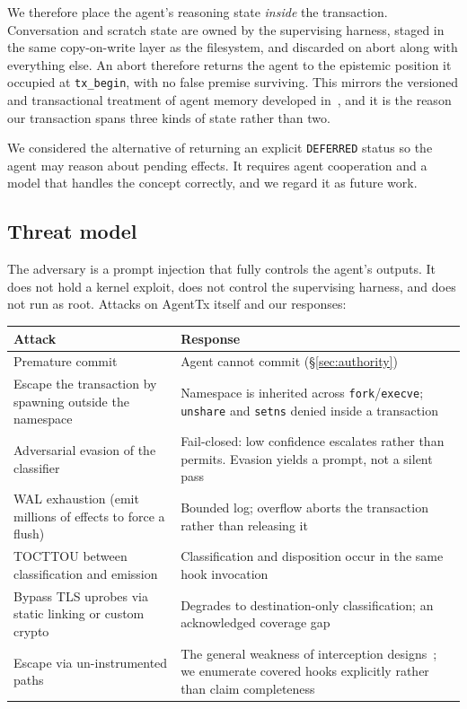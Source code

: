 \documentclass[10pt,twocolumn]{article}
\newcommand{\sys}{AgentTx}
\begin{document}
We therefore place the agent's reasoning state \emph{inside} the transaction.
Conversation and scratch state are owned by the supervising harness, staged in
the same copy-on-write layer as the filesystem, and discarded on abort along
with everything else. An abort therefore returns the agent to the
epistemic position it occupied at \texttt{tx\_begin}, with no false premise
surviving. This mirrors the versioned and transactional treatment of agent
memory developed in~\cite{chronomem2026,memtx2026}, and it is the reason our
transaction spans three kinds of state rather than two.

We considered the alternative of returning an explicit \texttt{DEFERRED} status
so the agent may reason about pending effects. It requires agent cooperation and
a model that handles the concept correctly, and we regard it as future work.

\subsection{Threat model}
\label{sec:threat}

The adversary is a prompt injection that fully controls the agent's outputs. It
does not hold a kernel exploit, does not control the supervising harness, and
does not run as root. Attacks on \sys{} itself and our responses:

\begin{center}
\small
\begin{tabular}{@{}p{2.6cm}p{4.6cm}@{}}
\toprule
\textbf{Attack} & \textbf{Response}\\
\midrule
Premature commit & Agent cannot commit (\S\ref{sec:authority})\\
Escape the transaction by spawning outside the namespace &
  Namespace is inherited across \texttt{fork}/\texttt{execve};
  \texttt{unshare} and \texttt{setns} denied inside a transaction\\
Adversarial evasion of the classifier &
  Fail-closed: low confidence escalates rather than permits. Evasion yields a
  prompt, not a silent pass\\
WAL exhaustion (emit millions of effects to force a flush) &
  Bounded log; overflow aborts the transaction rather than releasing it\\
TOCTTOU between classification and emission &
  Classification and disposition occur in the same hook invocation\\
Bypass TLS uprobes via static linking or custom crypto &
  Degrades to destination-only classification; an acknowledged coverage gap\\
Escape via un-instrumented paths &
  The general weakness of interception designs~\cite{sandboxescapes};
  we enumerate covered hooks explicitly rather than claim completeness\\
\bottomrule
\end{tabular}
\end{center}
\end{document}
